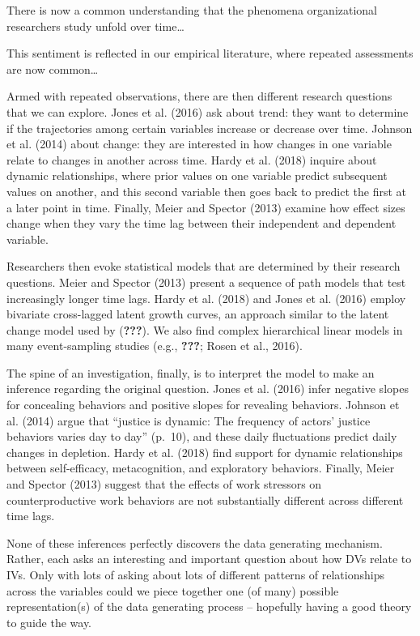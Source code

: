 \documentclass[english,,man]{apa6}
\theoremstyle{definition}
\theoremstyle{definition}
\theoremstyle{definition}
\theoremstyle{remark}
\begin{document}
There is now a common understanding that the phenomena organizational
researchers study unfold over time\ldots{}

This sentiment is reflected in our empirical literature, where repeated
assessments are now common\ldots{}

Armed with repeated observations, there are then different research
questions that we can explore. Jones et al. (2016) ask about trend: they
want to determine if the trajectories among certain variables increase
or decrease over time. Johnson et al. (2014) about change: they are
interested in how changes in one variable relate to changes in another
across time. Hardy et al. (2018) inquire about dynamic relationships,
where prior values on one variable predict subsequent values on another,
and this second variable then goes back to predict the first at a later
point in time. Finally, Meier and Spector (2013) examine how effect
sizes change when they vary the time lag between their independent and
dependent variable.

Researchers then evoke statistical models that are determined by their
research questions. Meier and Spector (2013) present a sequence of path
models that test increasingly longer time lags. Hardy et al. (2018) and
Jones et al. (2016) employ bivariate cross-lagged latent growth curves,
an approach similar to the latent change model used by ({\textbf{???}}).
We also find complex hierarchical linear models in many event-sampling
studies (e.g., {\textbf{???}}; Rosen et al., 2016).

The spine of an investigation, finally, is to interpret the model to
make an inference regarding the original question. Jones et al. (2016)
infer negative slopes for concealing behaviors and positive slopes for
revealing behaviors. Johnson et al. (2014) argue that \enquote{justice
is dynamic: The frequency of actors' justice behaviors varies day to
day} (p.~10), and these daily fluctuations predict daily changes in
depletion. Hardy et al. (2018) find support for dynamic relationships
between self-efficacy, metacognition, and exploratory behaviors.
Finally, Meier and Spector (2013) suggest that the effects of work
stressors on counterproductive work behaviors are not substantially
different across different time lags.

None of these inferences perfectly discovers the data generating
mechanism. Rather, each asks an interesting and important question about
how DVs relate to IVs. Only with lots of asking about lots of different
patterns of relationships across the variables could we piece together
one (of many) possible representation(s) of the data generating process
-- hopefully having a good theory to guide the way.
\end{document}
